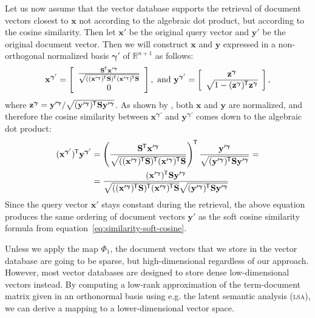 \documentclass[
  digital, %
  notable, %
  lof,     %
  lot,     %
  nopalatino, color
]{fithesis3}
\def\abbr#1{\textsc{\MakeLowercase{#1}}}
\newcommand*{\tran}{^{\mkern-1.5mu\mathsf{T}}}
\begin{document}
Let us now assume that the vector database supports the retrieval of document
vectors closest to $\mathbf x$ not according to the algebraic dot product, but
according to the cosine similarity. Then let $\mathbf
x'$ be the original query vector and $\mathbf y'$ be the original document
vector. Then we will construct $\mathbf x$ and $\mathbf y$ expressed in a
non-orthogonal normalized basis $\bm\gamma'$ of
$\mathbb{R}^{n+1}$ as follows:
\begin{equation*}
  \mathbf x^{\bm\gamma'} = \left[\begin{array}{c}\frac{\mathbf S\tran\mathbf x'^{\bm\gamma}}{\sqrt{((\mathbf x'^{\bm\gamma})\tran\mathbf S)\tran(\mathbf x'^{\bm\gamma})\tran\mathbf S}} \\ 0\end{array}\right],\text{ and }
  \mathbf y^{\bm\gamma'} = \left[\begin{array}{c}\mathbf z^{\bm\gamma} \\ \sqrt{1-(\mathbf z^{\bm\gamma})\tran\mathbf z^{\bm\gamma}}\end{array}\right],
\end{equation*}
where $\mathbf z^{\bm\gamma} = \mathbf y'^{\bm\gamma} / \sqrt{(\mathbf y'^{\bm\gamma})\tran\mathbf S\mathbf y'^{\bm\gamma}}$.
As shown by \textcite[sec.~4.3]{neyshabur2015symmetric}, both $\mathbf x$ and
$\mathbf y$ are normalized, and therefore the cosine similarity between $\mathbf x^{\bm\gamma'}$ and $\mathbf y^{\bm\gamma'}$ comes
down to the algebraic dot product:
\begin{align*}
  (\mathbf x^{\bm\gamma'})\tran\mathbf y^{\bm\gamma'}
  &= \left(\frac{\mathbf S\tran\mathbf x'^{\bm\gamma}}{\sqrt{((\mathbf x'^{\bm\gamma})\tran\mathbf S)\tran(\mathbf x'^{\bm\gamma})\tran\mathbf S}}\right)\tran
  \frac{\mathbf y'^{\bm\gamma}}{\sqrt{(\mathbf y'^{\bm\gamma})\tran\mathbf S\mathbf y'^{\bm\gamma}}} = \\
  &= \frac{(\mathbf x'^{\bm\gamma})\tran\mathbf S\mathbf y'^{\bm\gamma}}{\sqrt{((\mathbf x'^{\bm\gamma})\tran\mathbf S)\tran(\mathbf x'^{\bm\gamma})\tran\mathbf S}\sqrt{(\mathbf y'^{\bm\gamma})\tran\mathbf S\mathbf y'^{\bm\gamma}}}
\end{align*}
Since the query vector $\mathbf x'$ stays constant during the retrieval, the above
equation produces the same ordering of document vectors $\mathbf y'$ as the soft
cosine similarity formula from equation~\ref{eq:similarity-soft-cosine}.

Unless we apply the map $\Phi_1$, the document vectors that we
store in the vector database are going to be sparse, but high-dimensional
regardless of our approach. However, most vector databases are designed to
store dense low-dimensional vectors instead. By computing a low-rank
approximation of the term-document matrix given in an orthonormal basis using
e.g.  the latent semantic analysis (\abbr{LSA})\index{LSA@\abbr{LSA}}, we can
derive a mapping to a lower-dimensional vector space.
\end{document}
